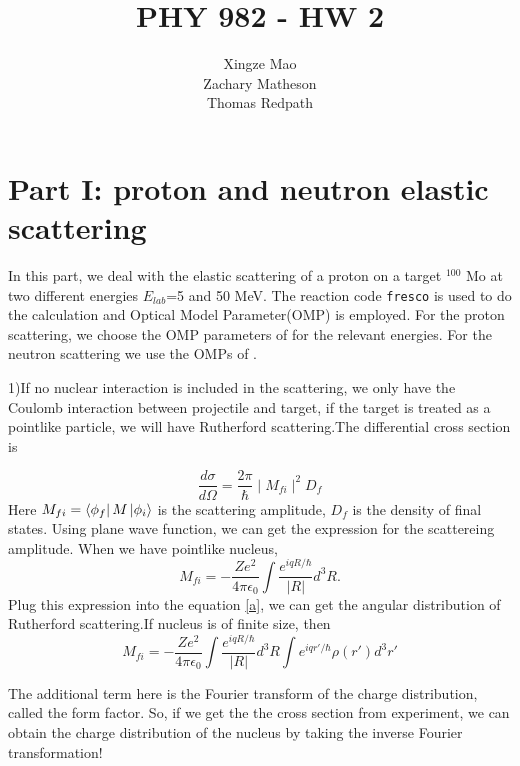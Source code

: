 \documentclass[]{scrartcl}
\title{PHY 982 - HW 2}
\author{Xingze Mao \\ Zachary Matheson \\ Thomas Redpath}
\date{}
\begin{document}
\maketitle

\section*{Part I: proton and neutron elastic scattering}


In this part, we deal with the elastic scattering of a proton on a target $^{100}$ Mo at two different energies $E_{lab}$=5 and 50 MeV. The reaction code \texttt{fresco} is used to do the calculation and Optical Model Parameter(OMP) is employed. For the proton scattering, we choose the OMP parameters of \citep{Menet1971} for the relevant energies. For the neutron scattering we use the OMPs of \citep{Koning2003}.

1)If no nuclear interaction is included in the scattering, we only have the Coulomb interaction between projectile and target, if the target is treated as a pointlike particle, we will have Rutherford scattering.The differential cross section is

\begin{equation}
\frac{d\sigma}{d\Omega}=\frac{2\pi}{\hbar}\mid M_{fi}\mid^2 D_f
\label{a}
\end{equation}
Here $M_{fi}=\bra{\phi_f}M\ket{\phi_i}$ is the scattering amplitude, $D_f$ is the density of final states.
Using plane wave function, we can get the expression for the scattereing amplitude. When we have pointlike nucleus,
\begin{equation}
M_{fi}=-\frac{Ze^2}{4\pi\epsilon_0}\int\frac{e^{iqR/\hbar}}{|R|}d^3R.  
\end{equation}
Plug this expression into the equation \ref{a}, we can get the angular distribution of Rutherford scattering.If nucleus is of finite size, then 
\begin{equation}
M_{fi}=-\frac{Ze^2}{4\pi\epsilon_0}\int\frac{e^{iqR/\hbar}}{|R|}d^3R\int e^{iqr'/\hbar}\rho(r')d^3r'
\end{equation}

The additional term here is the Fourier transform of the charge distribution, called the form factor. So, if we get the the cross section from experiment, we can obtain the charge distribution of the nucleus by taking the inverse Fourier transformation! 

\end{document}
